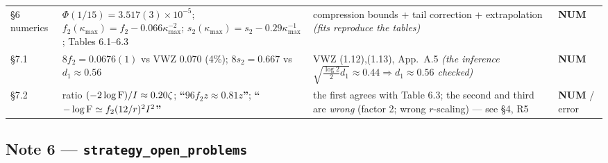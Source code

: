 \documentclass[11pt]{article}
\newcommand{\stNUM}{{\color{orange!80!black}\textsf{\scriptsize\bfseries NUM}}}
\newcommand{\CMI}{I}
\newcommand{\zz}{\zeta}
\begin{document}
{\begin{tabularx}{\textwidth}{L{0.155\textwidth} X L{0.210\textwidth} L{0.098\textwidth}}
\S6 numerics & $\Phi(1/15)=3.517(3)\!\times\!10^{-5}$; $f_2(\kappa_{\max})=f_2-0.066\kappa_{\max}^{-2}$; $s_2(\kappa_{\max})=s_2-0.29\kappa_{\max}^{-1}$; Tables 6.1--6.3 & compression bounds + tail correction + extrapolation \emph{(fits reproduce the tables)} & \stNUM \\
\S7.1 & $8f_2=0.0676(1)$ vs VWZ $0.070$ (4\%); $8s_2=0.667$ vs $d_1\approx0.56$ & VWZ (1.12),(1.13), App.~A.5 \emph{(the inference $\sqrt{\frac{\log2}2d_1}\approx0.44\Rightarrow d_1\approx0.56$ checked)} & \stNUM \\
\S7.2 & ratio $(-2\log\Fid)/\CMI\approx0.20\zz$; \textbf{``$96f_2z\approx0.81z$''}; \textbf{``$-\log\Fid\simeq f_2(12/r)^2\CMI^2$''} & the first agrees with Table 6.3; the second and third are \emph{wrong} (factor 2; wrong $r$-scaling) --- see \S4, R5 & \stNUM{} / error \\
\bottomrule
\end{tabularx}}

\subsection{Note 6 --- \texttt{strategy\_open\_problems}}
\end{document}
